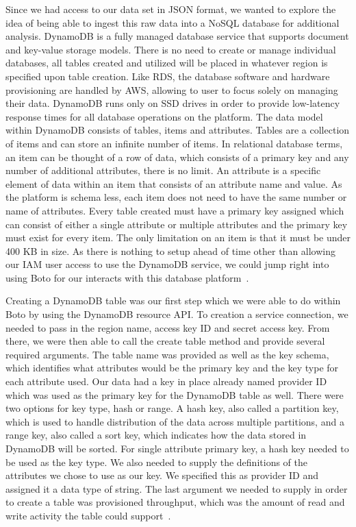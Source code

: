 Since we had access to our data set in JSON format, we wanted to explore the 
idea of being able to ingest this raw data into a NoSQL database for 
additional analysis. DynamoDB is a fully managed database service that 
supports document and key-value storage models. There is no need to create 
or manage individual databases, all tables created and utilized will be 
placed in whatever region is specified upon table creation. Like RDS, the 
database software and hardware provisioning are handled by AWS, allowing 
to user to focus solely on managing their data. DynamoDB runs only on SSD 
drives in order to provide low-latency response times for all database 
operations on the platform. The data model within DynamoDB consists of 
tables, items and attributes. Tables are a collection of items and can store 
an infinite number of items. In relational database terms, an item can be 
thought of a row of data, which consists of a primary key and any number of 
additional attributes, there is no limit. An attribute is a specific element 
of data within an item that consists of an attribute name and value. As the 
platform is schema less, each item does not need to have the same number or 
name of attributes. Every table created must have a primary key assigned which 
can consist of either a single attribute or multiple attributes and the 
primary key must exist for every item. The only limitation on an item is that 
it must be under 400 KB in size. As there is nothing to setup ahead of time 
other than allowing our IAM user access to use the DynamoDB service, we could 
jump right into using Boto for our interacts with this database 
platform~\cite{hid-sp18-521-dynamodbfaq}. 

Creating a DynamoDB table was our first step which we were able to do within 
Boto by using the DynamoDB resource API. To creation a service connection, we 
needed to pass in the region name, access key ID and secret access key. From 
there, we were then able to call the create table method and provide several 
required arguments. The table name was provided as well as the key schema, 
which identifies what attributes would be the primary key and the key type 
for each attribute used. Our data had a key in place already named provider ID 
which was used as the primary key for the DynamoDB table as well. There were 
two options for key type, hash or range. A hash key, also called a partition 
key, which is used to handle distribution of the data across multiple 
partitions, and a range key, also called a sort key, which indicates how the 
data stored in DynamoDB will be sorted. For single attribute primary key, a 
hash key needed to be used as the key type. We also needed to supply the 
definitions of the attributes we chose to use as our key. We specified this 
as provider ID and assigned it a data type of string. The last argument we 
needed to supply in order to create a table was provisioned throughput, which 
was the amount of read and write activity the table could 
support~\cite{hid-sp18-521-dynamodbfaq}.  

